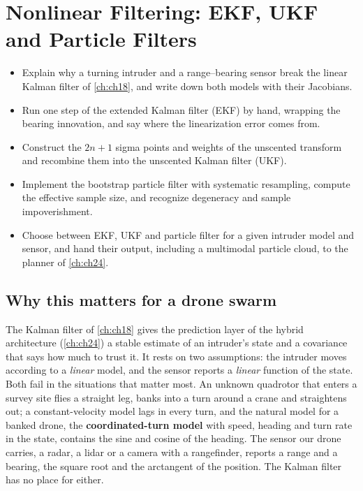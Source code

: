 \chapter[Nonlinear Filtering]{Nonlinear Filtering: EKF, UKF and Particle Filters}
\label{ch:ch19}

\begin{objectives}
\begin{itemize}
  \item Explain why a turning intruder and a range--bearing sensor break the linear Kalman filter of \cref{ch:ch18}, and write down both models with their Jacobians.
  \item Run one step of the extended Kalman filter (EKF) by hand, wrapping the bearing innovation, and say where the linearization error comes from.
  \item Construct the $2n+1$ sigma points and weights of the unscented transform and recombine them into the unscented Kalman filter (UKF).
  \item Implement the bootstrap particle filter with systematic resampling, compute the effective sample size, and recognize degeneracy and sample impoverishment.
  \item Choose between EKF, UKF and particle filter for a given intruder model and sensor, and hand their output, including a multimodal particle cloud, to the planner of \cref{ch:ch24}.
\end{itemize}
\end{objectives}

\section[Why this matters]{Why this matters for a drone swarm}
\label{sec:ch19-motivation}

The Kalman filter of \cref{ch:ch18} gives the prediction layer of the hybrid
architecture (\cref{ch:ch24}) a stable estimate of an intruder's state and a
covariance that says how much to trust it. It rests on two assumptions: the
intruder moves according to a \emph{linear} model, and the sensor reports a
\emph{linear} function of the state. Both fail in the situations that matter
most. An unknown quadrotor that enters a survey site flies a straight leg,
banks into a turn around a crane and straightens out; a constant-velocity
model lags in every turn, and the natural model for a banked drone, the
\textbf{coordinated-turn model} with speed,
heading and turn rate in the state, contains the sine and cosine of the
heading. The sensor our drone carries, a radar, a lidar or a camera with a
rangefinder, reports a range and a bearing, the square root and the
arctangent of the position. The Kalman filter has no place for either.


